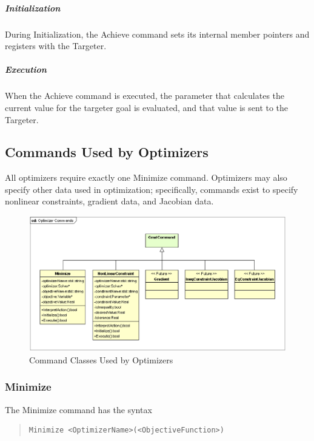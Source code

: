 \subparagraph{Initialization}

During Initialization, the Achieve command sets its internal member pointers and registers with the
Targeter.

\subparagraph{Execution}

When the Achieve command is executed, the parameter that calculates the current value for the
targeter goal is evaluated, and that value is sent to the Targeter.

\subsection{\label{section:OptimizationCommands}Commands Used by Optimizers}

All optimizers require exactly one Minimize command.  Optimizers may also specify other data used
in optimization; specifically, commands exist to specify nonlinear constraints, gradient data, and
Jacobian data.

\begin{figure}
\begin{center}
\includegraphics[scale=0.5]{Images/OptimizerCommands.eps}
\caption{\label{figure:OptimizerCommands}Command Classes Used by Optimizers}
\end{center}
\end{figure}

\subsubsection{Minimize}

The Minimize command has the syntax

\begin{quote}
\begin{verbatim}
Minimize <OptimizerName>(<ObjectiveFunction>)
\end{verbatim}
\end{quote}

